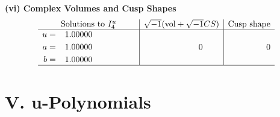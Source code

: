 \documentclass[1p]{elsarticle_modified}
\theoremstyle{definition}
\newcommand{\I}{\sqrt{-1}}
\begin{document}
\newpage\flushleft \textbf{(vi) Complex Volumes and Cusp Shapes}
$$\begin{array}{c|c|c}  
\text{Solutions to }I^u_{4}& \I (\text{vol} + \sqrt{-1}CS) & \text{Cusp shape}\\
 \hline 
\begin{aligned}
u &= \phantom{-}1.00000\phantom{ +0.000000I} \\
a &= \phantom{-}1.00000\phantom{ +0.000000I} \\
b &= \phantom{-}1.00000\phantom{ +0.000000I}\end{aligned}
 & \phantom{-0.000000 } 0 & \phantom{-0.000000 } 0\\
 \hline 
 \end{array}$$\newpage
\newpage\renewcommand{\arraystretch}{1}
\centering \section*{ V. u-Polynomials}
\end{document}
